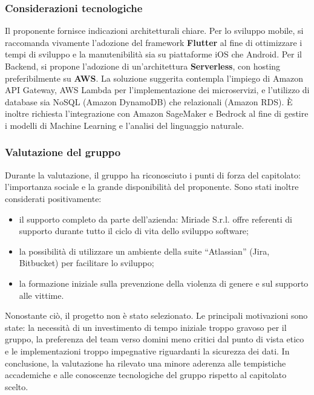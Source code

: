 \documentclass[a4paper,12pt]{article}
\begin{document}
\subsubsection{Considerazioni tecnologiche}

Il proponente fornisce indicazioni architetturali chiare. Per lo sviluppo mobile, si raccomanda vivamente l'adozione del framework \textbf{Flutter} al fine di ottimizzare i tempi di sviluppo e la manutenibilità sia su piattaforme iOS che Android. Per il Backend, si propone l'adozione di un'architettura \textbf{Serverless}, con hosting preferibilmente su \textbf{AWS}. La soluzione suggerita contempla l'impiego di Amazon API Gateway, AWS Lambda per l'implementazione dei microservizi, e l'utilizzo di database sia NoSQL (Amazon DynamoDB) che relazionali (Amazon RDS). È inoltre richiesta l'integrazione con Amazon SageMaker e Bedrock al fine di gestire i modelli di Machine Learning e l'analisi del linguaggio naturale.

\subsubsection{Valutazione del gruppo}

Durante la valutazione, il gruppo ha riconosciuto i punti di forza del capitolato: l’importanza sociale e la grande disponibilità del proponente. Sono stati inoltre considerati positivamente:
\begin{itemize}
    \item il supporto completo da parte dell’azienda: Miriade S.r.l. offre referenti di supporto durante tutto il ciclo di vita dello sviluppo software;
    \item la possibilità di utilizzare un ambiente della suite ``Atlassian'' (Jira, Bitbucket) per facilitare lo sviluppo;
    \item la formazione iniziale sulla prevenzione della violenza di genere e sul supporto alle vittime.
\end{itemize}

Nonostante ciò, il progetto non è stato selezionato. Le principali motivazioni sono state: la necessità di un investimento di tempo iniziale troppo gravoso per il gruppo, la preferenza del team verso domini meno critici dal punto di vista etico e le implementazioni troppo impegnative riguardanti la sicurezza dei dati. In conclusione, la valutazione ha rilevato una minore aderenza alle tempistiche accademiche e alle conoscenze tecnologiche del gruppo rispetto al capitolato scelto.
\end{document}
